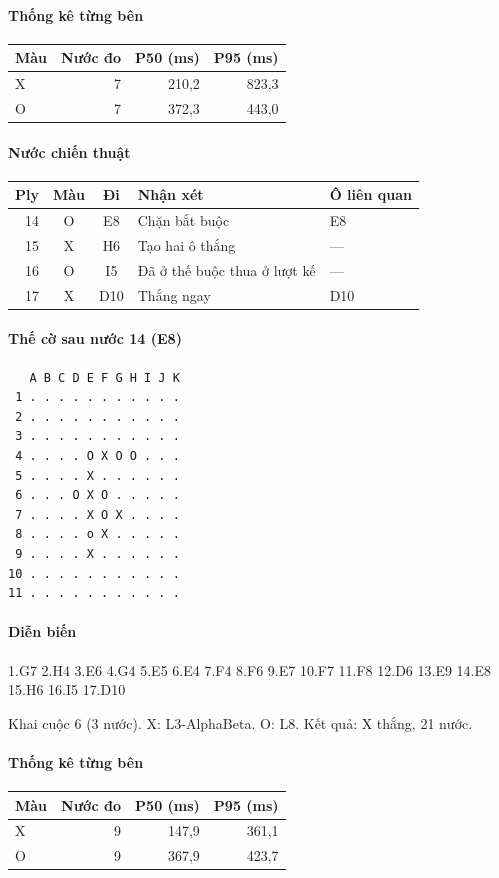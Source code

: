\paragraph{Thống kê từng bên}
\begin{center}\small
\begin{tabular}{@{}lrrr@{}}
\toprule
Màu & Nước đo & P50 (ms) & P95 (ms) \\
\midrule
X & 7 & 210,2 & 823,3 \\
O & 7 & 372,3 & 443,0 \\
\bottomrule
\end{tabular}
\end{center}
\paragraph{Nước chiến thuật}
\begin{center}\small
\begin{tabular}{@{}rccll@{}}
\toprule
Ply & Màu & Đi & Nhận xét & Ô liên quan \\
\midrule
14 & O & E8 & Chặn bắt buộc & E8 \\
15 & X & H6 & Tạo hai ô thắng & — \\
16 & O & I5 & Đã ở thế buộc thua ở lượt kế & — \\
17 & X & D10 & Thắng ngay & D10 \\
\bottomrule
\end{tabular}
\end{center}
\paragraph{Thế cờ sau nước 14 (E8)}
\begin{verbatim}
   A B C D E F G H I J K
 1 . . . . . . . . . . .
 2 . . . . . . . . . . .
 3 . . . . . . . . . . .
 4 . . . . O X O O . . .
 5 . . . . X . . . . . .
 6 . . . O X O . . . . .
 7 . . . . X O X . . . .
 8 . . . . o X . . . . .
 9 . . . . X . . . . . .
10 . . . . . . . . . . .
11 . . . . . . . . . . .
\end{verbatim}
\paragraph{Diễn biến}
{\footnotesize 1.G7 2.H4 3.E6 4.G4 5.E5 6.E4 7.F4 8.F6 9.E7 10.F7 11.F8 12.D6 13.E9 14.E8 15.H6 16.I5 17.D10\par}
Khai cuộc 6 (3 nước). X: L3-AlphaBeta. O: L8. Kết quả: X thắng, 21 nước.
\paragraph{Thống kê từng bên}
\begin{center}\small
\begin{tabular}{@{}lrrr@{}}
\toprule
Màu & Nước đo & P50 (ms) & P95 (ms) \\
\midrule
X & 9 & 147,9 & 361,1 \\
O & 9 & 367,9 & 423,7 \\
\bottomrule
\end{tabular}
\end{center}
